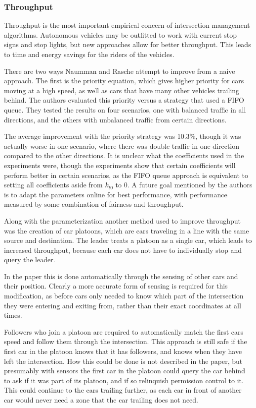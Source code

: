 \documentclass[12pt]{article}
\begin{document}
\subsubsection{Throughput}
Throughput is the most important empirical concern of intersection management algorithms. Autonomous vehicles may be outfitted to work with current stop signs and stop lights, but new approaches allow for better throughput. This leads to time and energy savings for the riders of the vehicles.\par
There are two ways Naumman and Rasche attempt to improve from a naive approach. The first is the priority equation, which gives higher priority for cars moving at a high speed, as well as cars that have many other vehicles trailing behind. The authors evaluated this priority versus a strategy that used a FIFO queue. They tested the results on four scenarios, one with balanced traffic in all directions, and the others with unbalanced traffic from certain directions. \par
The average improvement with the priority strategy was 10.3\%, though it was actually worse in one scenario, where there was double traffic in one direction compared to the other directions. It is unclear what the coefficients used in the experiments were, though the experiments show that certain coefficients will perform better in certain scenarios, as the FIFO queue approach is equivalent to setting all coefficients aside from $k_{t0}$ to 0. A future goal mentioned by the authors is to adapt the parameters online for best performance, with performance measured by some combination of fairness and throughput.\par
Along with the parameterization another method used to improve throughput was the creation of car platoons, which are cars traveling in a line with the same source and destination. The leader treats a platoon as a single car, which leads to increased throughput, because each car does not have to individually stop and query the leader. \par
In the paper this is done automatically through the sensing of other cars and their position. Clearly a more accurate form of sensing is required for this modification, as before cars only needed to know which part of the intersection they were entering and exiting from, rather than their exact coordinates at all times. \par
Followers who join a platoon are required to automatically match the first cars speed and follow them through the intersection. This approach is still safe if the first car in the platoon knows that it has followers, and knows when they have left the intersection. How this could be done is not described in the paper, but presumably with sensors the first car in the platoon could query the car behind to ask if it was part of its platoon, and if so relinquish permission control to it. This could continue to the cars trailing further, as each car in front of another car would never need a zone that the car trailing does not need.\par
\end{document}
